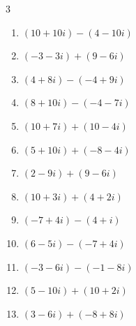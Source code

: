 \begin{multicols}{3}
\begin{enumerate}
  \item $\displaystyle (10+10i) - (4-10i)$

        \phantom{$\displaystyle =6+20i$}

  \item $\displaystyle (-3-3i) + (9-6i)$

        \phantom{$\displaystyle =6-9i$}

  \item $\displaystyle (4+8i) - (-4+9i)$

        \phantom{$\displaystyle =8-i$}

  \item $\displaystyle (8+10i) - (-4-7i)$

        \phantom{$\displaystyle =12+17i$}

\columnbreak %

  \item $\displaystyle (10+7i) + (10-4i)$

        \phantom{$\displaystyle =20+3i$}

  \item $\displaystyle (5+10i) + (-8-4i)$

        \phantom{$\displaystyle =-3+6i$}

  \item $\displaystyle (2-9i) + (9-6i)$

        \phantom{$\displaystyle =11-15i$}

  \item $\displaystyle (10+3i) + (4+2i)$

        \phantom{$\displaystyle =14+5i$}

  \item $\displaystyle (-7+4i) - (4+i)$

        \phantom{$\displaystyle =-11+3i$}

  \item $\displaystyle (6-5i) - (-7+4i)$

        \phantom{$\displaystyle =13-9i$}

  \item $\displaystyle (-3-6i) - (-1-8i)$

        \phantom{$\displaystyle =-2+2i$}

  \item $\displaystyle (5-10i) + (10+2i)$

        \phantom{$\displaystyle =15-8i$}

  \item $\displaystyle (3-6i) + (-8+8i)$


\end{enumerate}
\end{multicols}
